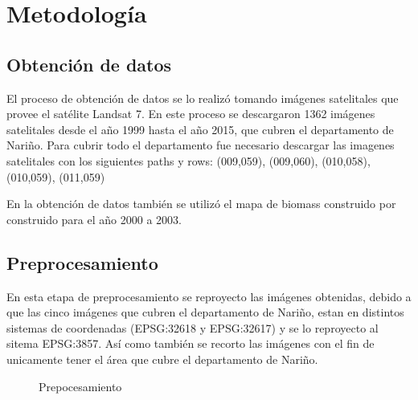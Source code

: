  
\section{Metodología}

\subsection{Obtención de datos}

El proceso de obtención de datos se lo realizó tomando imágenes satelitales que provee el satélite
Landsat 7. En este proceso se descargaron 1362 imágenes satelitales desde el año 1999 hasta el año 2015, que cubren el 
departamento de Nariño. Para cubrir todo el departamento fue necesario descargar las imagenes satelitales con 
los siguientes paths y rows: (009,059), (009,060), (010,058), (010,059), (011,059) 

En la obtención de datos también se utilizó el mapa de biomass construido por \cite{baccini2012estimated} 
construido para el año 2000 a 2003.


\subsection{Preprocesamiento}

En esta etapa de preprocesamiento se reproyecto las imágenes obtenidas, debido a que las cinco imágenes
que cubren el departamento de Nariño, estan en distintos sistemas de coordenadas (EPSG:32618 y EPSG:32617) y se 
lo reproyecto al sitema EPSG:3857. Así como también se recorto las imágenes con el fin de unicamente tener 
el área que cubre el departamento de Nariño.

\begin{figure}
  \centering
  \vfill
  \caption{Prepocesamiento}
  \label{fig:Recortar imágenes}
\end{figure}


